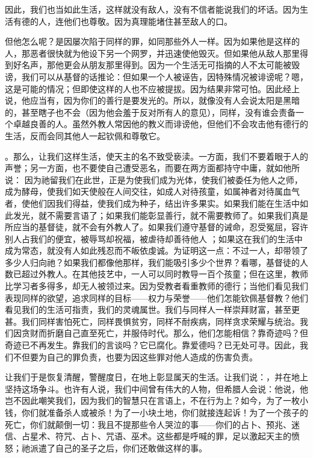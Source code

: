 因此，我们也当如此生活，这样就没有敌人，没有不信者能说我们的坏话。因为生活有德的人，连他们也尊敬。因为真理能堵住甚至敌人的口。\par

但他怎么呢？是因屡次陷于同样的罪，如同那些外人一样。因为如果他是这样的人，那恶者很快就为他设下另一个网罗，并迅速使他毁灭。但如果他从敌人那里得到好名声，那他更会从朋友那里得到。因为一个生活无可指摘的人不太可能被毁谤，我们可以从基督的话推论：但如果一个人被诬告，因特殊情况被诽谤呢？嗯，这是可能的情况；但即使这样的人也不应被提拔。因为结果非常可怕。因此经上说，他应当有，因为你们的善行是要发光的。所以，就像没有人会说太阳是黑暗的，甚至瞎子也不会（因为他会羞于反对所有人的意见），同样，没有谁会责备一个卓越良善的人。虽然外教人常因他的教义而诽谤他，但他们不会攻击他有德行的生活，反而会同其他人一起钦佩和尊敬它。\par

。那么，让我们这样生活，使天主的名不致受亵渎。一方面，我们不要着眼于人的声誉；另一方面，也不要使自己遭受恶名，而要在两方面都持守中庸，就如他所说： 因为祂留我们在此世，正是为使我们成为光体，使我们被委任为他人之师，成为酵母，使我们如天使般在人间交往，如成人对待孩童，如属神者对待属血气者，使他们因我们得益，使我们成为种子，结出许多果实。如果我们能在生活中如此发光，就不需要言语了；如果我们能彰显善行，就不需要教师了。如果我们真是所应当的基督徒，就不会有外教人了。如果我们遵守基督的诫命，忍受冤屈，容许别人占我们的便宜，被辱骂却祝福，被虐待却善待他人 ；如果这在我们的生活中成为常态，就没有人如此残忍而不皈依虔诚。为证明这一点：不过一人，却带领了多少人归向祂？如果我们都像他那样，我们能吸引多少个世界？看哪，基督徒的人数已超过外教人。在其他技艺中，一人可以同时教导一百个孩童；但在这里，教师比学习者多得多，却无人被领过来。因为受教者看重教师的德行；当他们看见我们表现同样的欲望，追求同样的目标——权力与荣誉——他们怎能钦佩基督教？他们看见我们的生活可指责，我们的灵魂属世。我们与同样人一样崇拜财富，甚至更甚。我们同样害怕死亡，同样畏惧贫穷，同样不耐疾病，同样贪求荣耀与统治。我们因贪财而折磨自己直至死亡，并服侍时代。那么，他们怎能相信？靠奇迹吗？但奇迹已不再发生。靠我们的言谈吗？它已腐化。靠爱德吗？已无处可寻。因此，我们不但要为自己的罪负责，也要为因这些罪对他人造成的伤害负责。\par

让我们于是恢复清醒，警醒度日，在地上彰显属天的生活。让我们说：，并在地上坚持这场争斗。也许有人说，我们中间曾有伟大的人物，但希腊人会说：他说，他岂不因此嘲笑我们，因为我们的智慧只在言语上，不在行为上？如今，为了一枚小钱，你们就准备杀人或被杀！为了一小块土地，你们就接连起诉！为了一个孩子的死亡，你们就颠倒一切：我且不提那些令人哭泣的事——你们的占卜、预兆、迷信、占星术、符咒、占卜、咒语、巫术。这些都是呼喊的罪，足以激起天主的愤怒；祂派遣了自己的圣子之后，你们还敢做这样的事。\par

